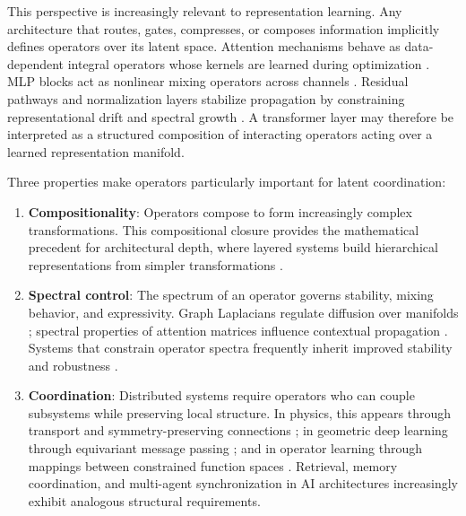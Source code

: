 This perspective is increasingly relevant to representation learning. Any architecture that routes, gates, compresses, or composes information implicitly defines operators over its latent space. Attention mechanisms behave as data-dependent integral operators whose kernels are learned during optimization \cite{tsai2019transformer}. MLP blocks act as nonlinear mixing operators across channels \cite{elhage2021mathematical}. Residual pathways and normalization layers stabilize propagation by constraining representational drift and spectral growth \cite{xiong2020layer}. A transformer layer may therefore be interpreted as a structured composition of interacting operators acting over a learned representation manifold.

Three properties make operators particularly important for latent coordination:

\begin{enumerate}

\item \textbf{Compositionality}: Operators compose to form increasingly complex transformations. This compositional closure provides the mathematical precedent for architectural depth, where layered systems build hierarchical representations from simpler transformations \cite{mallat2012group}.

\item \textbf{Spectral control}: The spectrum of an operator governs stability, mixing behavior, and expressivity. Graph Laplacians regulate diffusion over manifolds \cite{chung1997spectral}; spectral properties of attention matrices influence contextual propagation \cite{dong2021attention}. Systems that constrain operator spectra frequently inherit improved stability and robustness \cite{khalil2002nonlinear}.

\item \textbf{Coordination}: Distributed systems require operators who can couple subsystems while preserving local structure. In physics, this appears through transport and symmetry-preserving connections \cite{nakahara2003geometry}; in geometric deep learning through equivariant message passing \cite{bronstein2021geometric}; and in operator learning through mappings between constrained function spaces \cite{li2020neural}. Retrieval, memory coordination, and multi-agent synchronization in AI architectures increasingly exhibit analogous structural requirements.

\end{enumerate}

